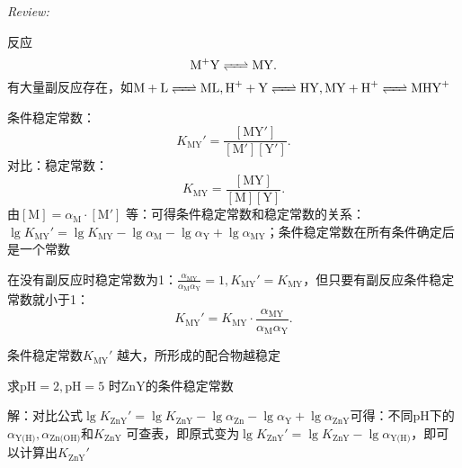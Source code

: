 \textit{Review:}

反应\[
    \ce{M+Y}\ce{<=>[][]}\ce{MY}
.\]
有大量副反应存在，如$\ce{M +L}\ce{<=>[][]}\ce{ML},\ce{H+ +Y}\ce{<=>[][]}\ce{HY},\ce{MY +H+}\ce{<=>[][]}\ce{MHY+}$

\begin{notation}
    条件稳定常数：\[
        K_{\text{MY}}'=\frac{[\text{MY}']}{[\text{M}'][\text{Y}']}
    .\]
    对比：稳定常数：\[
        K_{\text{MY}}=\frac{[\text{MY}]}{[\text{M}][\text{Y}]}
    .\]
    由$[\text{M}]=\alpha_\text{M}\cdot [\text{M}']$ 等：可得条件稳定常数和稳定常数的关系：$\lg K_\text{MY}'=\lg K_\text{MY}-\lg\alpha_\text{M}-\lg\alpha_\text{Y}+\lg\alpha_\text{MY}$；条件稳定常数在所有条件确定后是一个常数
\end{notation}
在没有副反应时稳定常数为1：$\frac{\alpha_\text{MY}}{\alpha_\text{M}\alpha_\text{Y}}=1,K_\text{MY}'=K_\text{MY}$，但只要有副反应条件稳定常数就小于1：\[
    K_\text{MY}'=K_\text{MY}\cdot \frac{\alpha_\text{MY}}{\alpha_\text{M}\alpha_\text{Y}}
.\]
\begin{notation}
    条件稳定常数$K_{\text{MY}}'$ 越大，所形成的配合物越稳定
\end{notation}
\begin{eg}
    求$\text{pH}=2,\text{pH}=5$ 时ZnY的条件稳定常数
\end{eg}
解：对比公式$\lg K_\text{ZnY}'=\lg K_\text{ZnY}-\lg\alpha_\text{Zn}-\lg\alpha_\text{Y}+\lg\alpha_\text{ZnY}$可得：不同pH下的$\alpha_\text{Y(H)},\alpha_\text{Zn(OH)}$和$K_{\text{ZnY}}$ 可查表，即原式变为$\lg K_\text{ZnY}'=\lg K_{\text{ZnY}}-\lg\alpha_\text{Y(H)}$，即可以计算出$K_\text{ZnY}'$

